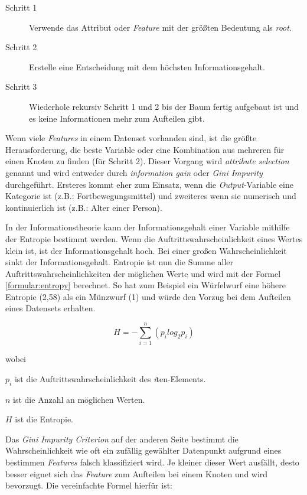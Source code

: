 \begin{description}
	\item[Schritt 1] Verwende das Attribut oder \textit{Feature} mit der größten Bedeutung als \textit{root}.
	\item[Schritt 2] Erstelle eine Entscheidung mit dem höchsten Informationsgehalt.
	\item[Schritt 3] Wiederhole rekursiv Schritt 1 und 2 bis der Baum fertig aufgebaut ist und es keine Informationen mehr zum Aufteilen gibt.
\end{description}

Wenn viele \textit{Features} in einem Datenset vorhanden sind, ist die größte Herausforderung, die beste Variable oder eine Kombination aus mehreren für einen Knoten zu finden (für Schritt 2). Dieser Vorgang wird \textit{attribute selection} genannt und wird entweder durch \textit{information gain} oder \textit{Gini Impurity} durchgeführt. Ersteres kommt eher zum Einsatz, wenn die \textit{Output}-Variable eine Kategorie ist (z.B.: Fortbewegungsmittel) und zweiteres wenn sie numerisch und kontinuierlich ist (z.B.: Alter einer Person).

In der Informationstheorie kann der Informationsgehalt einer Variable mithilfe der Entropie bestimmt werden. Wenn die Auftrittswahrscheinlichkeit eines Wertes klein ist, ist der Informationsgehalt hoch. Bei einer großen Wahrscheinlichkeit sinkt der Informationsgehalt. Entropie ist nun die Summe aller Auftrittswahrscheinlichkeiten der möglichen Werte und wird mit der Formel \ref{formular:entropy} berechnet. So hat zum Beispiel ein Würfelwurf eine höhere Entropie (2,58) als ein Münzwurf (1) und würde den Vorzug bei dem Aufteilen eines Datensets erhalten.

\begin{equation}
	H = -\sum \limits_{i=1}^n (p_i log_2 p_i)
	\label{formular:entropy}
\end{equation}

\noindent
wobei

\noindent
$p_i$ ist die Auftrittswahrscheinlichkeit des \textit{i}ten-Elements.

\noindent
$n$ ist die Anzahl an möglichen Werten.

\noindent
$H$ ist die Entropie.

Das \textit{Gini Impurity Criterion} auf der anderen Seite bestimmt die Wahrscheinlichkeit wie oft ein zufällig gewählter Datenpunkt aufgrund eines bestimmen \textit{Features} falsch klassifiziert wird. Je kleiner dieser Wert ausfällt, desto besser eignet sich das \textit{Feature} zum Aufteilen bei einem Knoten und wird bevorzugt. Die vereinfachte Formel hierfür ist:

